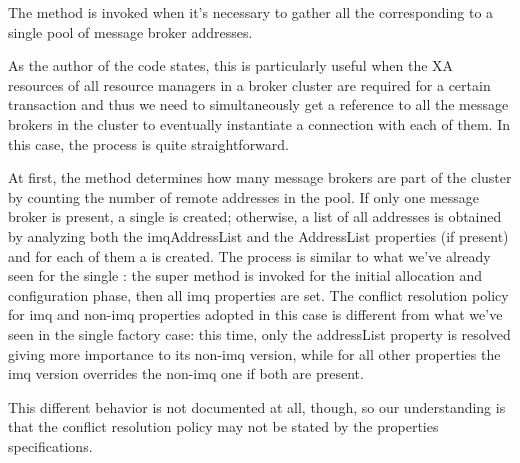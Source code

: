 The  method is invoked when it's necessary to gather all the  corresponding to a single pool of message broker addresses.

As the author of the code states, this is particularly useful when the XA resources of all resource managers in a broker cluster are required for a certain transaction and thus we need to simultaneously get a reference to all the message brokers in the cluster to eventually instantiate a connection with each of them. In this case, the process is quite straightforward.

At first, the method determines how many message brokers are part of the cluster by counting the number of remote addresses in the pool. If only one message broker is present, a single  is created; otherwise, a list of all addresses is obtained by analyzing both the imqAddressList and the AddressList properties (if present) and for each of them a  is created. The process is similar to what we've already seen for the single : the super method is invoked for the initial allocation and configuration phase, then all imq properties are set. The conflict resolution policy for imq and non-imq properties adopted in this case is different from what we've seen in the single factory case: this time, only the addressList property is resolved giving more importance to its non-imq version, while for all other properties the imq version overrides the non-imq one if both are present.

This different behavior is not documented at all, though, so our understanding is that the conflict resolution policy may not be stated by the properties specifications.